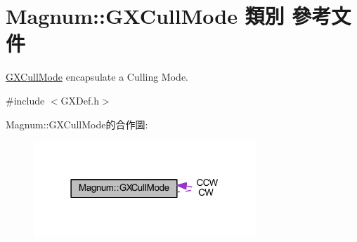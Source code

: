 \hypertarget{class_magnum_1_1_g_x_cull_mode}{}\section{Magnum\+:\+:G\+X\+Cull\+Mode 類別 參考文件}
\label{class_magnum_1_1_g_x_cull_mode}


\hyperlink{class_magnum_1_1_g_x_cull_mode}{G\+X\+Cull\+Mode} encapsulate a Culling Mode.  




{\ttfamily \#include $<$G\+X\+Def.\+h$>$}



Magnum\+:\+:G\+X\+Cull\+Mode的合作圖\+:\nopagebreak
\begin{figure}[H]
\begin{center}
\leavevmode
\includegraphics[width=238pt]{class_magnum_1_1_g_x_cull_mode__coll__graph}
\end{center}
\end{figure}
